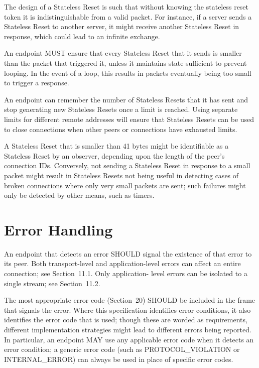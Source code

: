 \documentclass{article}
\begin{document}
The design of a Stateless Reset is such that without knowing the stateless reset token it is indistinguishable from a valid packet. For instance, if a server sends a Stateless Reset to another server, it might receive another Stateless Reset in response, which could lead to an infinite exchange.

An endpoint MUST ensure that every Stateless Reset that it sends is smaller than the packet that triggered it, unless it maintains state sufficient to prevent looping.  In the event of a loop, this results in packets eventually being too small to trigger a response.

An endpoint can remember the number of Stateless Resets that it has sent and stop generating new Stateless Resets once a limit is reached.  Using separate limits for different remote addresses will ensure that Stateless Resets can be used to close connections when other peers or connections have exhausted limits.

A Stateless Reset that is smaller than 41 bytes might be identifiable as a Stateless Reset by an observer, depending upon the length of the peer's connection IDs.  Conversely, not sending a Stateless Reset in response to a small packet might result in Stateless Resets not being useful in detecting cases of broken connections where only very small packets are sent; such failures might only be detected by other means, such as timers.

\section{Error Handling}

An endpoint that detects an error SHOULD signal the existence of that error to its peer.  Both transport-level and application-level errors can affect an entire connection; see Section~11.1.  Only application- level errors can be isolated to a single stream; see Section~11.2.

The most appropriate error code (Section~20) SHOULD be included in the frame that signals the error.  Where this specification identifies error conditions, it also identifies the error code that is used; though these are worded as requirements, different implementation strategies might lead to different errors being reported.  In particular, an endpoint MAY use any applicable error code when it detects an error condition; a generic error code (such as PROTOCOL\_VIOLATION or INTERNAL\_ERROR) can always be used in place of specific error codes.
\end{document}
